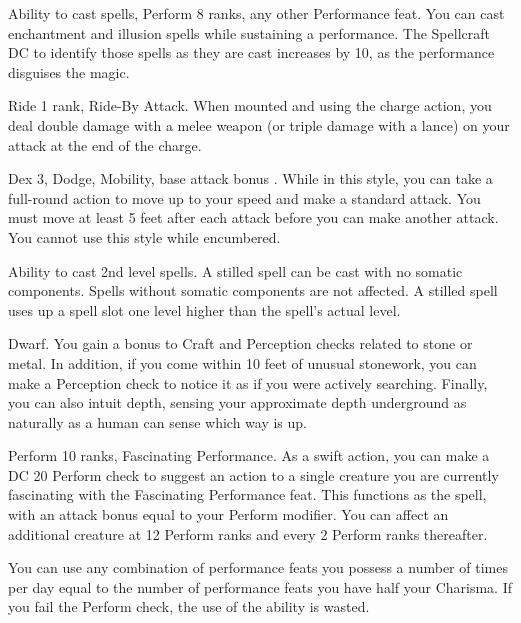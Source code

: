 \featpre Ability to cast spells, Perform 8 ranks, any other Performance feat.
\featben You can cast enchantment and illusion spells while sustaining a performance. The Spellcraft DC to identify those spells as they are cast increases by 10, as the performance disguises the magic.

 Ride 1 rank, Ride-By Attack.
 When mounted and using the charge action, you deal double damage with a melee weapon (or triple damage with a lance) on your attack at the end of the charge.%

 Dex 3, Dodge, Mobility, base attack bonus .
 While in this style, you can take a full-round action to move up to your speed and make a standard attack. You must move at least 5 feet after each attack before you can make another attack. You cannot use this style while encumbered.

 Ability to cast 2nd level spells.
 A stilled spell can be cast with no somatic components. Spells without somatic components are not affected. A stilled spell uses up a spell slot one level higher than the spell's actual level.

 Dwarf.
 You gain a  bonus to Craft and Perception checks related to stone or metal. In addition, if you come within 10 feet of unusual stonework, you can make a Perception check to notice it as if you were actively searching. Finally, you can also intuit depth, sensing your approximate depth underground as naturally as a human can sense which way is up.

\featpre Perform 10 ranks, Fascinating Performance.
\featben As a swift action, you can make a DC 20 Perform check to suggest an action to a single creature you are currently fascinating with the Fascinating Performance feat. This functions as the  spell, with an attack bonus equal to your Perform modifier. You can affect an additional creature at 12 Perform ranks and every 2 Perform ranks thereafter.

You can use any combination of performance feats you possess a number of times per day equal to the number of performance feats you have \add half your Charisma. If you fail the Perform check, the use of the ability is wasted.

